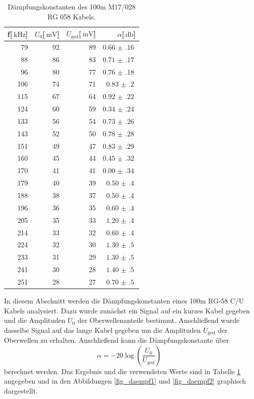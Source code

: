 \begin{table}
\centering
	\caption[]{Dämpfungskonstanten des 100m M17/028 RG 058 Kabels.}
	\begin{tabular}{r r r r}
	\toprule
		f[$\SI{}{\kilo\hertz}$] & $U_0$[$\SI{}{\milli\volt}$] & $U_\text{ged}$[$\SI{}{\milli\volt}$] & $\alpha$[$\SI{}{\decibel}$]\\
		\midrule
			79	&	92	&	89	&	$\SI{0.66(16)}{}$ \\
			88	&	86	&	83	&	$\SI{0.71(17)}{}$ \\
			96	&	80	&	77	&	$\SI{0.76(18)}{}$ \\
			106	&	74	&	71	&	$\SI{0.83(20)}{}$ \\
			115	&	67	&	64	&	$\SI{0.92(22)}{}$ \\
			124	&	60	&	59	&	$\SI{0.34(24)}{}$ \\
			133	&	56	&	54	&	$\SI{0.73(26)}{}$ \\
			143	&	52	&	50	&	$\SI{0.78(28)}{}$ \\
			151	&	49	&	47	&	$\SI{0.83(29)}{}$ \\
			160	&	45	&	44	&	$\SI{0.45(32)}{}$ \\
			170	&	41	&	41	&	$\SI{0.00(34)}{}$ \\
			179	&	40	&	39	&	$\SI{0.50(40)}{}$ \\
			188	&	38	&	37	&	$\SI{0.50(40)}{}$ \\
			196	&	36	&	35	&	$\SI{0.60(40)}{}$ \\
			205	&	35	&	33	&	$\SI{1.20(40)}{}$ \\
			214	&	33	&	32	&	$\SI{0.60(40)}{}$ \\
			224	&	32	&	30	&	$\SI{1.30(50)}{}$ \\
			233	&	31	&	29	&	$\SI{1.30(50)}{}$ \\
			241	&	30	&	28	&	$\SI{1.40(50)}{}$ \\
			251	&	28	&	27	&	$\SI{0.70(50)}{}$ \\
			\bottomrule
	\end{tabular}
	\label{tab_daempf}
\end{table}

In diesem Abschnitt werden die Dämpfungskonstanten eines 100m RG-58 C/U Kabels analysiert.
Dazu wurde zunächst ein Signal auf ein kurzes Kabel gegeben und die Amplituden $U_0$ der Oberwellenanteile bestimmt.
Anschließend wurde dasselbe Signal auf das lange Kabel gegeben um die Amplituden $U_\text{ged}$ der Oberwellen zu erhalten.
Anschließend kann die Dämpfungskonstante über
\begin{equation*}
	\alpha = -20 \log \left( \frac{U_0}{U_\text{ged}}\right)
\end{equation*}
berechnet werden.
Das Ergebnis und die verwendeten Werte sind in Tabelle \ref{tab_daempf} angegeben und in den Abbildungen \ref{fig_daempf1} und \ref{fig_daempf2} graphisch dargestellt.

